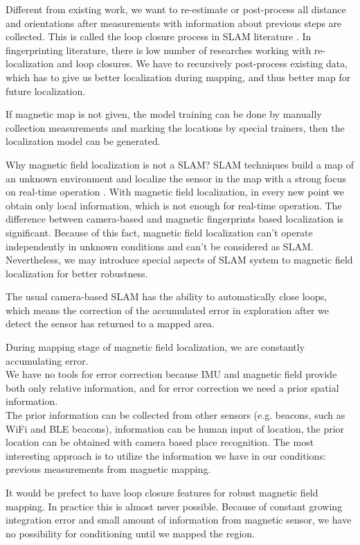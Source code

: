 Different from existing work, we want to re-estimate or post-process all distance and orientations after measurements with information about previous steps are collected. This is called the loop closure process in SLAM literature \cite{orb-slam, orb-slam2}. In fingerprinting literature, there is low number of researches working with re-localization and loop closures. We have to recursively post-process existing data, which has to give us better localization during mapping, and thus better map for future localization.

If magnetic map is not given, the model training can be done by manually collection measurements and marking the locations by special trainers, then the localization model can be generated.

Why magnetic field localization is not a SLAM? SLAM techniques build a map of an unknown environment and localize the sensor in the map with a strong focus on real-time operation \cite{orb-slam}. With magnetic field localization, in every new point we obtain only local information, which is not enough for real-time operation. The difference between camera-based and magnetic fingerprints based localization is significant. Because of this fact, magnetic field localization can’t operate independently in unknown conditions and can’t be considered as SLAM. Nevertheless, we may introduce special aspects of SLAM system to magnetic field localization for better robustness.

The usual camera-based SLAM has the ability to automatically close loops, which means the correction of the accumulated error in exploration after we detect the sensor has returned to a mapped area.

During mapping stage of magnetic field localization, we are constantly accumulating error. \\
We have no tools for error correction because IMU and magnetic field provide both only relative information, and for error correction we need a prior spatial information. \\
The prior information can be collected from other sensors (e.g. beacons, such as WiFi and BLE beacons), information can be human input of location, the prior location can be obtained with camera based place recognition. The most interesting approach is to utilize the information we have in our conditions: previous measurements from magnetic mapping. 

It would be prefect to have loop closure features for robust magnetic field mapping. In practice this is almost never possible. Because of constant growing integration error and small amount of information from magnetic sensor, we have no possibility for conditioning until we mapped the region.

